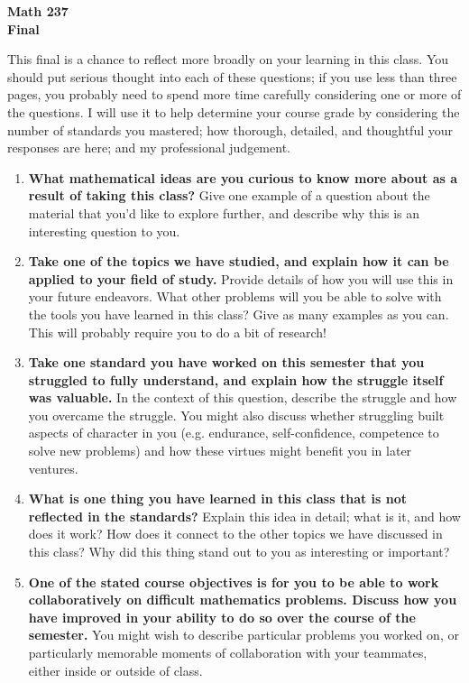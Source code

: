 \documentclass{article}
\begin{document}
\begin{center}
\textbf{Math 237 \\ Final}
\end{center}

This final is a chance to reflect more broadly on your learning in this class. You should put serious thought into each of these questions; if you use less than three pages, you probably need to spend more time carefully considering one or more of the questions.  I will use it to help determine your course grade by considering the number of standards you mastered; how thorough, detailed, and thoughtful your responses are here; and my professional judgement.

\begin{enumerate}
\item \textbf{What mathematical ideas are you curious to know more about as a result of taking this class?}  Give one example of a question about the material that you'd like to explore further, and describe why this is an interesting question to you.

\item \textbf{Take one of the topics we have studied, and explain how it can be applied to your field of study.}  Provide details of how you will use this in your future endeavors. What other problems will you be able to solve with the tools you have learned in this class? Give as many examples as you can. This will probably require you to do a bit of research!

\item \textbf{Take one standard you have worked on this semester that you struggled to fully understand, and explain how the struggle itself was valuable.}  In the context of this question, describe the struggle and how you overcame the struggle. You might also discuss whether struggling built aspects of character in you (e.g. endurance, self-confidence, competence to solve new problems) and how these virtues might benefit you in later ventures.

\item \textbf{What is one thing you have learned in this class that is not reflected in the standards?}  Explain this idea in detail; what is it, and how does it work? How does it connect to the other topics we have discussed in this class?  Why did this thing stand out to you as interesting or important?

\item \textbf{One of the stated course objectives is for you to be able to work collaboratively on difficult mathematics problems. Discuss how you have improved in your ability to do so over the course of the semester.} You might wish to describe particular problems you worked on, or particularly memorable moments of collaboration with your teammates, either inside or outside of class. 


\end{enumerate}
\end{document}
